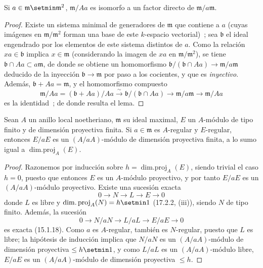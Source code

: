 \begin{lemma}[17.3.1.3]
\label{0.17.3.1.3-es}
Si $a\in\mathfrak m\setmin\mathfrak{m}^2$, $\mathfrak{m}/Aa$ es isomorfo a un
factor directo de $\mathfrak{m}/a\mathfrak{m}$.
\end{lemma}

\begin{proof}
Existe un sistema minimal de generadores de $\mathfrak{m}$ que contiene a $a$
(cuyas imágenes en $\mathfrak{m}/\mathfrak{m}^2$ forman una base de este
$k$-espacio vectorial)~; sea $\mathfrak{b}$ el ideal engendrado por los elementos
de este sistema distintos de $a$. Como la relación $xa\in\mathfrak{b}$ implica
$x\in\mathfrak{m}$ (considerando la imagen de $xa$ en
$\mathfrak{m}/\mathfrak{m}^2$), se tiene
$\mathfrak{b}\cap Aa\subset a\mathfrak{m}$, de donde se obtiene un homomorfismo
$\mathfrak{b}/(\mathfrak{b}\cap Aa)\longrightarrow
\mathfrak{m}/a\mathfrak{m}$ deducido de la inyección
$\mathfrak{b}\longrightarrow\mathfrak{m}$ por paso a los cocientes, y que
es \emph{inyectivo}. Además, $\mathfrak{b}+Aa=\mathfrak{m}$, y
el homomorfismo compuesto
\[
  \mathfrak{m}/Aa=(\mathfrak{b}+Aa)/Aa
  \xrightarrow{\sim}\mathfrak{b}/(\mathfrak{b}\cap Aa)
  \longrightarrow\mathfrak{m}/a\mathfrak{m}
  \longrightarrow\mathfrak{m}/Aa
\]
es la identidad~; de donde resulta el lema.
\end{proof}

\begin{lemma}[17.3.1.4]
\label{0.17.3.1.4-es}
Sean $A$ un anillo local noetheriano, $\mathfrak{m}$ su ideal maximal, $E$
un $A$-módulo de tipo finito y de dimensión proyectiva finita. Si
$a\in\mathfrak{m}$ es $A$-regular y $E$-regular, entonces $E/aE$ es un
$(A/aA)$-módulo de dimensión proyectiva finita, a lo sumo igual a
$\operatorname{dim.proj}_A(E)$.
\end{lemma}
\begin{proof}
Razonemos por inducción sobre $h=\operatorname{dim.proj}_A(E)$, siendo trivial
el caso $h=0$, puesto que entonces $E$ es un $A$-módulo proyectivo, y por tanto
$E/aE$ es un $(A/aA)$-módulo proyectivo. Existe una sucesión exacta
\[
  0\longrightarrow N\longrightarrow L\longrightarrow E\longrightarrow0
\]
donde $L$ es libre y $\operatorname{dim.proj}_A(N)=h\setmin 1$ (17.2.2, (iii)), siendo
$N$ de tipo finito. Además, la sucesión
\[
  0\longrightarrow N/aN\longrightarrow L/aL\longrightarrow E/aE
  \longrightarrow0
\]
es exacta (15.1.18). Como $a$ es $A$-regular, también es $N$-regular, puesto
que $L$ es libre; la hipótesis de inducción implica que $N/aN$ es un
$(A/aA)$-módulo de dimensión proyectiva $\leq h\setmin 1$, y como $L/aL$ es un
$(A/aA)$-módulo libre, $E/aE$ es un $(A/aA)$-módulo de dimensión proyectiva
$\leq h$.
\end{proof}

